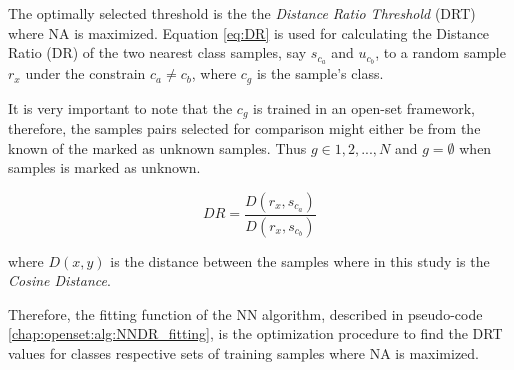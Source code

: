 The optimally selected threshold is the the \textit{Distance Ratio Threshold} (DRT) where NA is maximized. Equation \ref{eq:DR} is used for calculating the Distance Ratio (DR) of the two nearest class samples, say $s_{c_{a}}$ and $u_{c_{b}}$, to a random sample $r_{x}$ under the constrain $c_{a} \neq c_{b}$, where $c_{g}$ is the sample's class.

It is very important to note that the $c_{g}$ is trained in an open-set framework, therefore, the samples pairs selected for comparison might either be from the known of the marked as unknown samples. Thus $g \in {1,2,...,N}$ and $g = \emptyset$ when samples is marked as unknown.

\begin{equation} \label{eq:DR}
    DR = \frac{D(r_{x}, s_{c_{a}})}{D(r_{x}, s_{c_{b}})}
\end{equation}

\nointend where $D(x,y)$ is the distance between the samples where in this study is the \textit{Cosine Distance}.

Therefore, the fitting function of the NN algorithm, described in pseudo-code \ref{chap:openset:alg:NNDR_fitting}, is the optimization procedure to find the DRT values for classes respective sets of training samples where NA is maximized.

\hfill

